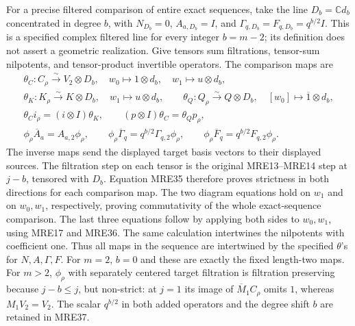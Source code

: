 For a precise filtered comparison of entire exact sequences, take
the line \(D_b=\mathbb Cd_b\) concentrated in degree \(b\), with
\(N_{D_b}=0\), \(A_{a,D_b}=I\), and
\(\Gamma_{q,D_b}=F_{q,D_b}=q^{b/2}I\). This is a specified complex
filtered line for every integer \(b=m-2\); its definition does not
assert a geometric realization. Give tensors sum filtrations,
tensor-sum nilpotents, and tensor-product invertible operators.
The comparison maps are
\[
 \begin{gathered}
 \theta_C:C_\rho\xrightarrow{\sim}V_2\otimes D_b,\quad
               w_0\mapsto1\otimes d_b,\quad w_1\mapsto u\otimes d_b,\\
 \theta_K:K_\rho\xrightarrow{\sim}K\otimes D_b,\quad
               w_1\mapsto u\otimes d_b,\qquad
 \theta_Q:Q_\rho\xrightarrow{\sim}Q\otimes D_b,\quad
               [w_0]\mapsto\overline1\otimes d_b,\\
 \theta_C i_\rho=(i\otimes I)\theta_K,\qquad
 (p\otimes I)\theta_C=\theta_Qp_\rho,\\
 \phi_\rho\overline A_a=A_{a,2}\phi_\rho,\qquad
 \phi_\rho\overline\Gamma_q=q^{b/2}\Gamma_{q,2}\phi_\rho,\qquad
 \phi_\rho\overline F_q=q^{b/2}F_{q,2}\phi_\rho.
 \end{gathered}
 \tag{MRE37}
\]
The inverse maps send the displayed target basis vectors to their
displayed sources. The filtration step on each tensor is the
original MRE13--MRE14 step at \(j-b\), tensored with \(D_b\).
Equation MRE35 therefore proves strictness in both directions for
each comparison map. The two diagram equations hold on \(w_1\)
and on \(w_0,w_1\), respectively, proving commutativity of the
whole exact-sequence comparison. The last three equations follow
by applying both sides to \(w_0,w_1\), using MRE17 and MRE36.
The same calculation intertwines the nilpotents with coefficient
one. Thus all maps in the sequence are intertwined by the
specified \(\theta\)'s for \(N,A,\Gamma,F\).
For \(m=2\), \(b=0\) and these are exactly the fixed length-two
maps. For \(m>2\), \(\phi_\rho\) with separately centered target
filtration is filtration preserving because \(j-b\leq j\), but
non-strict: at \(j=1\) its image of \(\overline M_1C_\rho\) omits
\(1\), whereas \(M_1V_2=V_2\). The scalar \(q^{b/2}\) in both
added operators and the degree shift \(b\) are retained in MRE37.

